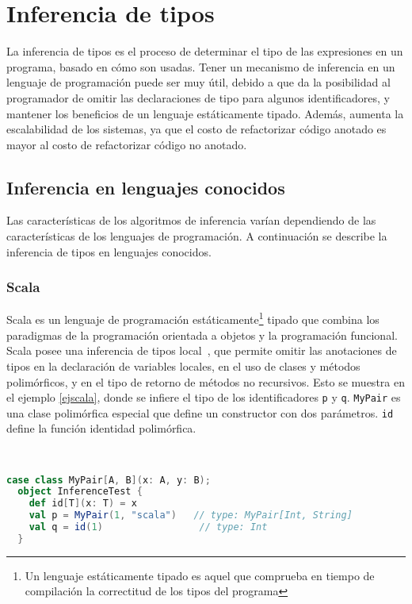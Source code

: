 \chapter{Inferencia de tipos} \label{inference}
La inferencia de tipos es el proceso de determinar el tipo de las expresiones en un programa, basado en cómo son usadas. Tener un mecanismo de inferencia en un lenguaje de programación puede ser muy útil, debido a que da la posibilidad al programador de omitir las declaraciones de tipo para algunos identificadores, y mantener los beneficios de un lenguaje estáticamente tipado. Además, aumenta la escalabilidad de los sistemas, ya que el costo de refactorizar código anotado es mayor al costo de refactorizar código no anotado.

\section{Inferencia en lenguajes conocidos}
Las características de los algoritmos de inferencia varían dependiendo de las características de los lenguajes de programación. A continuación se describe la inferencia de tipos en lenguajes conocidos.

\subsection{Scala}
Scala es un lenguaje de programación estáticamente\footnote{Un lenguaje estáticamente tipado es aquel que comprueba en tiempo de compilación la correctitud de los tipos del programa} tipado que combina los paradigmas de la programación orientada a objetos y la programación funcional. Scala posee una inferencia de tipos local~\cite{pierce}, que permite omitir las anotaciones de tipos en la declaración de variables locales, en el uso de clases y métodos polimórficos, y en el tipo de retorno de métodos no recursivos. Esto se muestra en el ejemplo \ref{ejscala}, donde se infiere el tipo de los identificadores \texttt{p} y \texttt{q}. \texttt{MyPair} es una clase polimórfica especial que define un constructor con dos parámetros. \texttt{id} define la función identidad polimórfica.
\clearpage
\begin{ej} \ \\
  \normalfont
  \label{ejscala}
\begin{lstlisting}[language=Scala]
  case class MyPair[A, B](x: A, y: B);
  object InferenceTest {
    def id[T](x: T) = x
    val p = MyPair(1, "scala")   // type: MyPair[Int, String]
    val q = id(1)                 // type: Int
  }
\end{lstlisting}
\end{ej}


